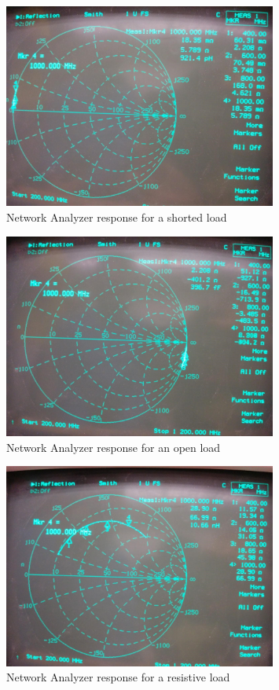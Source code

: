 \documentclass{article}
\begin{document}
\begin{figure}[H]
    \centering
    \includegraphics[width=0.8\textwidth]{./Images/253short.jpg}
    \caption{Network Analyzer response for a shorted load}
\end{figure}
\begin{figure}[H]
    \centering
    \includegraphics[width=0.8\textwidth]{./Images/253open.jpg}
    \caption{Network Analyzer response for an open load}
\end{figure}
\begin{figure}[H]
    \centering
    \includegraphics[width=0.8\textwidth]{./Images/253resisitive.jpg}
    \caption{Network Analyzer response for a resistive load}
\end{figure}
\end{document}

